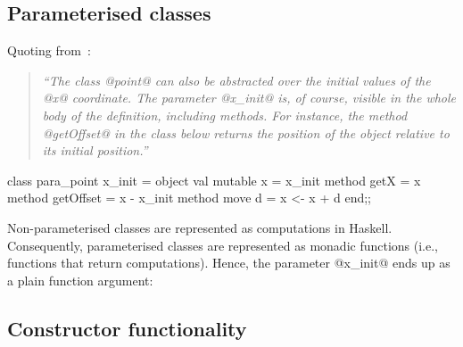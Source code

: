 


\subsection{Parameterised classes}

Quoting from~\cite[\S\,3.1]{OCaml}:

\begin{quote}\itshape
``The class @point@ can also be abstracted over the initial values of
the @x@ coordinate.  The parameter @x_init@ is, of course, visible in
the whole body of the definition, including methods. For instance, the
method @getOffset@ in the class below returns the position of the
object relative to its initial position.''
\end{quote}

\antiskip

\begin{code}
 class para_point x_init =
   object
     val mutable x    = x_init
     method getX      = x
     method getOffset = x - x_init
     method move d    = x <- x + d
   end;;
\end{code}

\noindent
Non-parameterised classes are represented as computations in Haskell.
Consequently, parameterised classes are represented as monadic
functions (i.e., functions that return computations). Hence, the
parameter @x_init@ ends up as a plain function argument:






\subsection{Constructor functionality}

